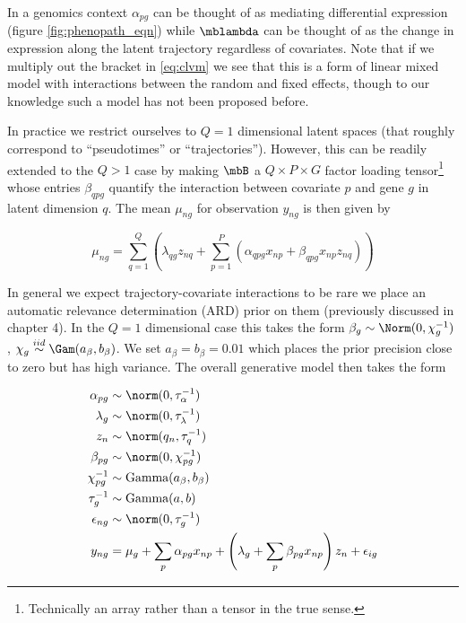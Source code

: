 In a genomics context $\alpha_{pg}$ can be thought of as mediating differential expression (figure \ref{fig:phenopath_eqn}) while $\mblambda$ can be thought of as the change in expression along the latent trajectory regardless of covariates. Note that if we multiply out the bracket in \ref{eq:clvm} we see that this is a form of linear mixed model with interactions between the random and fixed effects, though to our knowledge such a model has not been proposed before.

In practice we restrict ourselves to $Q=1$ dimensional latent spaces (that roughly correspond to ``pseudotimes'' or ``trajectories''). However, this can be readily extended to the $Q>1$ case by making $\mbB$ a $Q \times P \times G$ factor loading tensor\footnote{
Technically an array rather than a tensor in the true sense.
} whose entries $\beta_{qpg}$ quantify the interaction between covariate $p$ and gene $g$ in latent dimension $q$. The mean $\mu_{ng}$ for observation $y_{ng}$ is then given by

\begin{equation}
  \mu_{ng} = \sum_{q=1}^Q \left(
  \lambda_{qg} z_{nq} + \sum_{p=1}^P (\alpha_{qpg} x_{np} + \beta_{qpg} x_{np} z_{nq})
  \right)
\end{equation}

In general we expect trajectory-covariate interactions to be rare we place an automatic relevance determination (ARD) prior on them (previously discussed in chapter 4).
In the $Q=1$ dimensional case this takes the form $\beta_{g} \sim \Norm(0, \chi_g^{-1})$, $\chi_g \stackrel{iid}{\sim} \Gam(a_\beta, b_\beta)$. We set $a_\beta = b_\beta = 0.01$ which places the prior precision close to zero but has high variance. The overall generative model then takes the form

\begin{equation}
\begin{aligned}
\alpha_{pg} & \sim \norm(0, \tau_\alpha^{-1}) \\
\lambda_g & \sim \norm(0, \tau_\lambda^{-1}) \\
z_n & \sim \norm(q_n, \tau_q^{-1}) \\
\beta_{pg} & \sim \norm(0, \chi_{pg}^{-1}) \\
\chi_{pg}^{-1} & \sim \text{Gamma}(a_\beta, b_\beta) \\
\tau_{g}^{-1} & \sim \text{Gamma}(a, b) \\
\epsilon_{ng} & \sim \norm(0, \tau_g^{-1}) \\
y_{ng} & = \mu_g +  \sum_p \alpha_{pg} x_{np} + \left( \lambda_g + \sum_p \beta_{pg} x_{np} \right) z_n + \epsilon_{ig}
\end{aligned} \label{eq:clvm_model}
\end{equation}

